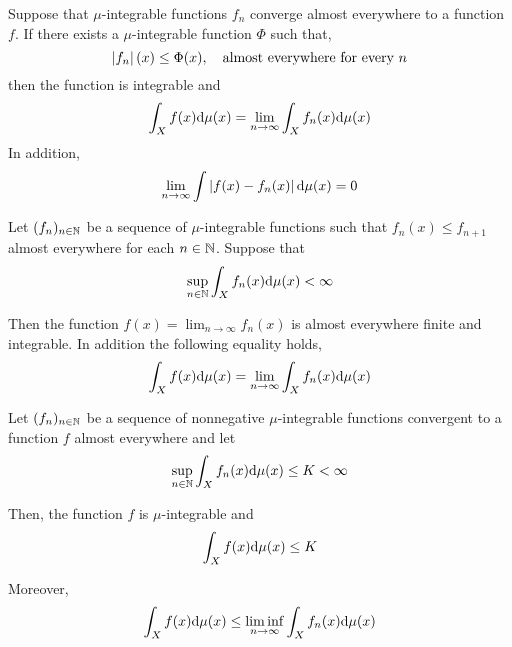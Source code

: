 \begin{theorem}
	Suppose that $\mu$-integrable functions $f_n$ converge almost everywhere to a function $f$. If there exists a $\mu$-integrable function $\Phi$ such that,
	\begin{equation*}
		\left| f_n \right|(x)\leq \Phi (x), \quad \text{almost everywhere for every } n
	\end{equation*}
	then the function is integrable and
	\begin{equation*}
		\int_X f(x)\mathrm{d}\mu(x) = \lim_{n\rightarrow\infty} \int_X f_n(x)\mathrm{d}\mu(x)
	\end{equation*}
	In addition,
	\begin{equation*}
		\lim_{n\rightarrow \infty } \int \left| f(x)-f_n(x) \right|\mathrm{d}\mu(x) =0
	\end{equation*}
\end{theorem}

\begin{theorem}
	Let $(f_n)_{n\in \mathbb{N}}$ be a sequence of $\mu$-integrable functions such that $f_n(x) \leq f_{n+1}$ almost everywhere for each $n \in \mathbb{N}$. Suppose that
	\begin{equation}
	\sup_{n\in \mathbb{N}}\int_X f_n(x)\mathrm{d}\mu(x) < \infty
	\end{equation}
	
	Then the function $f(x)=\lim_{n\rightarrow\infty} f_n(x)$ is almost everywhere finite and integrable. In addition the following equality holds,
	\begin{equation*}
		\int_X f(x)\mathrm{d}\mu(x) = \lim_{n\rightarrow\infty} \int_X f_n(x)\mathrm{d}\mu(x)	
	\end{equation*}
\end{theorem}

\begin{theorem}
	Let $(f_n)_{n\in \mathbb{N}}$ be a sequence of nonnegative $\mu$-integrable functions convergent to a function $f$ almost everywhere and let
	\begin{equation*}
		\sup_{n\in \mathbb{N}} \int_X f_n(x)\mathrm{d}\mu(x)\leq K <\infty
	\end{equation*}
	
	Then, the function $f$ is $\mu$-integrable and 
	\begin{equation*}
		\int_X f(x)\mathrm{d}\mu(x) \leq K
	\end{equation*}
	
	Moreover, 
	\begin{equation*}
		\int_X f(x)\mathrm{d}\mu(x)\leq \liminf_{n\rightarrow\infty} \int_{X} f_n (x)\mathrm{d}\mu(x)
	\end{equation*}
\end{theorem}

